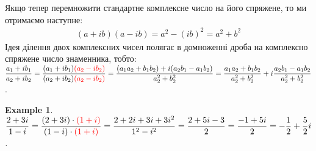 \documentclass[a4paper, 10pt]{article}
\theoremstyle{theoremdd}
\theoremstyle{theoremdd}
\theoremstyle{theoremdd}
\theoremstyle{theoremdd}
\newtheorem{example}[theorem]{Example}
\theoremstyle{theoremdd}
\theoremstyle{theoremdd}
\theoremstyle{theoremdd}
\theoremstyle{theoremdd}
\begin{document}
Якщо тепер перемножити стандартне комплексне число на його спряжене, то ми отримаємо наступне:
\begin{align*}
(a+ib)(a-ib) = a^2 - (ib)^2 = a^2 + b^2
\end{align*}
Ідея ділення двох комплексних чисел полягає в домноженні дроба на комплексно спряжене число знаменника, тобто:\\
$\dfrac{a_1+ ib_1}{a_2 + ib_2} = \dfrac{(a_1 + ib_1)\textcolor{red}{(a_2-ib_2)}}{(a_2+ib_2)\textcolor{red}{(a_2-ib_2)}} = \dfrac{(a_1a_2 + b_1b_2) + i(a_2b_1-a_1b_2)}{a_2^2 + b_2^2} = \dfrac{a_1a_2 + b_1b_2}{a_2^2 + b_2^2} + i \dfrac{a_2 b_1 - a_1 b_2}{a_2^2 + b_2^2}$.

\begin{example}
$\dfrac{2+3i}{1-i} = \dfrac{(2+3i) \cdot \textcolor{red}{(1+i)}}{(1-i) \cdot \textcolor{red}{(1+i)}} = \dfrac{2+2i+3i+3i^2}{1^2-i^2} = \dfrac{2+5i-3}{2} = \dfrac{-1+5i}{2} = -\dfrac{1}{2} + \dfrac{5}{2}i$.
\end{example}
\end{document}
